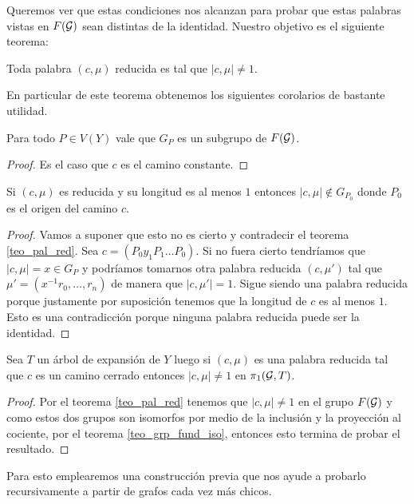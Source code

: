 \documentclass[tesis.tex]{subfiles}
\begin{document}
Queremos ver que estas condiciones nos alcanzan para probar que estas palabras vistas en $F({\cal G})$ sean distintas de la identidad.
Nuestro objetivo es el siguiente teorema:
\begin{teo}\label{teo_pal_red}
	Toda palabra $(c, \mu)$ reducida es tal que $|c,\mu| \neq 1$.
\end{teo}

En particular de este teorema obtenemos los siguientes corolarios de bastante utilidad.

\begin{coro}\label{coro_pal_red_1}
	Para todo $P \in V(Y)$ vale que $G_P$ es un subgrupo de $F({\cal G})$.
\end{coro}
\begin{proof}
	Es el caso que $c$ es el camino constante.
\end{proof}

\begin{coro}\label{coro_pal_red_2}
	Si $(c, \mu)$ es reducida y su longitud es al menos $1$ entonces $|c, \mu| \notin G_{P_0}$ donde $P_0$ es el origen del camino $c$.
\end{coro}
\begin{proof}
	Vamos a suponer que esto no es cierto y contradecir el teorema \ref{teo_pal_red}.
	Sea $c = (P_0y_1P_1\dots P_0)$.
	Si no fuera cierto tendríamos que $|c,\mu| = x \in G_P$ y podríamos tomarnos otra palabra reducida $(c,\mu')$ tal que $\mu' = (x^{-1}r_0, \dots, r_n)$ de manera que $|c,\mu'| = 1$.
	Sigue siendo una palabra reducida porque justamente por suposición tenemos que la longitud de $c$ es al menos $1$.
	Esto es una contradicción porque ninguna palabra reducida puede ser la identidad.
\end{proof}

\begin{coro}\label{coro_pal_red_3}
	Sea $T$ un árbol de expansión de $Y$ luego si $(c, \mu)$ es una palabra reducida tal que $c$ es un camino cerrado entonces $|c,\mu| \neq 1$ en $\pi_1({\cal G}, T)$. 
\end{coro}
\begin{proof}
	Por el teorema \ref{teo_pal_red} tenemos que $|c,\mu| \neq 1$ en el grupo $F({\cal G})$ y como estos dos grupos son isomorfos por medio de la inclusión y la proyección al cociente, por el teorema \ref{teo_grp_fund_iso}, entonces esto termina de probar el resultado.
\end{proof}

Para esto emplearemos una construcción previa que nos ayude a probarlo recursivamente a partir de grafos cada vez más chicos.
\end{document}
